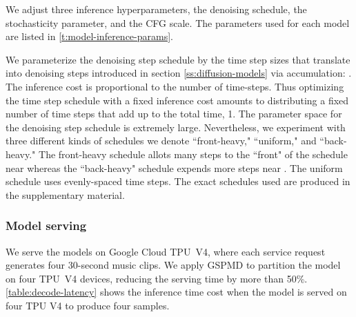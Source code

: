 \documentclass[nohyperref]{article}
\theoremstyle{plain}
\theoremstyle{definition}
\theoremstyle{remark}
\begin{document}
We adjust three inference hyperparameters, the denoising schedule, the stochasticity parameter, and the CFG scale. The parameters used for each model are listed in \cref{t:model-inference-params}.

We parameterize the denoising step schedule by the time step sizes  that translate into denoising steps introduced in section \ref{ss:diffusion-models} via accumulation: . The inference cost is proportional to the number of time-steps. Thus optimizing the time step schedule with a fixed inference cost amounts to distributing a fixed number of time steps that add up to the total time, 1. The parameter space for the denoising step schedule is extremely large. Nevertheless, we experiment with three different kinds of schedules we denote ``front-heavy," ``uniform," and ``back-heavy." The front-heavy schedule allots many steps to the ``front" of the schedule near  whereas the ``back-heavy" schedule expends more steps near . The uniform schedule uses evenly-spaced time steps. The exact schedules used are produced in the supplementary material.


\subsubsection{Model serving}
We serve the models on Google Cloud TPU~V4, where each service request generates four 30-second music clips. We apply GSPMD \cite{gspmd} to partition the model on four TPU~V4 devices, reducing the serving time by more than 50\%. \cref{table:decode-latency} shows the inference time cost when the model is served on four TPU V4 to produce four samples.

\begin{table}
\caption{Inference time cost on four TPU~V4 for four samples.}
\vskip 0.05in
  \label{table:decode-latency}
  \centering
\vskip-0.2in
\end{table}
\end{document}
